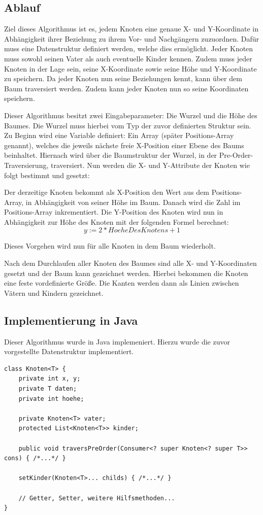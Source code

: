 \label{chap:kapitel3_1_Ablauf}
\subsection{Ablauf}
Ziel dieses Algorithmus ist es, jedem Knoten eine genaue X- und Y-Koordinate in Abhängigkeit ihrer Beziehung zu ihrem Vor- und Nachgängern
zuzuordnen. Dafür muss eine Datenstruktur definiert werden, welche dies ermöglicht. Jeder Knoten muss sowohl seinen Vater als auch eventuelle
Kinder kennen. Zudem muss jeder Knoten in der Lage sein, seine X-Koordinate sowie seine Höhe und Y-Koordinate zu speichern. Da jeder Knoten
nun seine Beziehungen kennt, kann über dem Baum traversiert werden. Zudem kann jeder Knoten nun so seine Koordinaten speichern.

Dieser Algorithmus besitzt zwei Eingabeparameter: Die Wurzel und die Höhe des Baumes.
Die Wurzel muss hierbei vom Typ der zuvor definierten Struktur sein. Zu Beginn wird eine Variable definiert:
Ein Array (später Positions-Array genannt), welches die jeweils nächste freie X-Position einer Ebene des Baums beinhaltet.
Hiernach wird über die Baumstruktur der Wurzel, in der Pre-Order-Traversierung, traversiert.
Nun werden die X- und Y-Attribute der Knoten wie folgt bestimmt und gesetzt:

Der derzeitige Knoten bekommt als X-Position den Wert aus dem Positions-Array, in Abhängigkeit von seiner Höhe im Baum.
Danach wird die Zahl im Positions-Array inkrementiert. Die Y-Position des Knoten wird nun in Abhängigkeit zur Höhe des Knoten
mit der folgenden Formel berechnet: $$y := 2 * HoeheDesKnotens + 1$$

Dieses Vorgehen wird nun für alle Knoten in dem Baum wiederholt. 

Nach dem Durchlaufen aller Knoten des Baumes sind alle X- und Y-Koordinaten gesetzt und der Baum kann gezeichnet werden.
Hierbei bekommen die Knoten eine feste vordefinierte Größe. Die Kanten werden dann als Linien zwischen Vätern und Kindern 
gezeichnet.

\subsection{Implementierung in Java}
Dieser Algorithmus wurde in Java implemeniert. Hierzu wurde die zuvor vorgestellte Datenstruktur
implementiert.

\begin{lstlisting}[caption=Vereinfachte Implementierung der Knotenklasse, label=code:knotenclass]
class Knoten<T> {
	private int x, y;
	private T daten;
	private int hoehe;
	
	private Knoten<T> vater;
	protected List<Knoten<T>> kinder;

	public void traversPreOrder(Consumer<? super Knoten<? super T>> cons) { /*...*/ }

	setKinder(Knoten<T>... childs) { /*...*/ }

	// Getter, Setter, weitere Hilfsmethoden...
}
\end{lstlisting}

